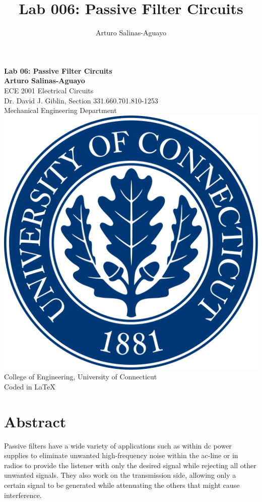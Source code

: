 \documentclass[12pt]{article}
\author{Arturo Salinas-Aguayo}
\title{Lab 006: Passive Filter Circuits}
\begin{document}
\newcommand{\closure}[2][3]{%
	{}\mkern#1mu\overline{\mkern-#1mu#2}}
\newcommand\ncoverline[1]{\mkern1mu\overline{\mkern-1mu#1\mkern-1mu}\mkern1mu}
\begin{titlepage}
	\centering
	\vspace*{3cm}
	\huge\textbf{Lab 06: Passive Filter Circuits}\\

	\vspace{5cm}
	\Large\textbf{Arturo Salinas-Aguayo}\\
	\normalsize
	ECE 2001 Electrical Circuits\\
	Dr. David J. Giblin, Section 331.660.701.810-1253\\
	Mechanical Engineering Department
	\vfill
	\includegraphics[scale=0.1]{uconnlogo}\\
	College of Engineering, University of Connecticut\\
	\scriptsize{Coded in \LaTeX}
	\vspace*{1cm}
\end{titlepage}
\tableofcontents
\newpage
\section{Abstract}
Passive filters have a wide variety of applications such as within dc power
supplies to eliminate unwanted high-frequency noise within the ac-line or in
radios to provide the listener with only the desired signal while rejecting all
other unwanted signals. They also work on the transmission side, allowing only a
certain signal to be generated while attenuating the others that might cause
interference.
\end{document}
